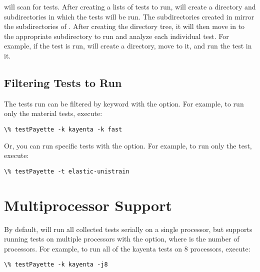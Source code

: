 \documentclass[letterpaper,10pt,english]{sphinxmanual}
\begin{document}
 will scan  for tests. After
creating a lists of tests to run,  will create a
 directory and subdirectories in which the tests
will be run. The subdirectories created in  mirror
the subdirectories of . After creating the
 directory tree, it will then move in to the
appropriate subdirectory to run and analyze each individual test. For example, if
the  test is run,
 will create a
 directory,
move to it, and run the  test in it.


\subsection{Filtering Tests to Run}
\label{Files/test_payette:filtering-tests-to-run}
The tests run can be filtered by keyword with the  option. For example, to
run only the   material tests, execute:

\begin{Verbatim}[commandchars=\\\{\}]
\% testPayette -k kayenta -k fast
\end{Verbatim}

Or, you can run specific tests with the  option. For example, to run only
the  test, execute:

\begin{Verbatim}[commandchars=\\\{\}]
\% testPayette -t elastic-unistrain
\end{Verbatim}


\section{Multiprocessor Support}
\label{Files/test_payette:multiprocessor-support}
By default,  will run all collected tests serially on a single
processor, but supports running tests on multiple processors with the  option, where  is the number of processors. For example, to run
all of the kayenta tests on 8 processors, execute:

\begin{Verbatim}[commandchars=\\\{\}]
\% testPayette -k kayenta -j8
\end{Verbatim}
\end{document}
